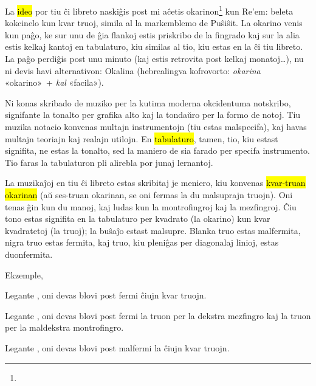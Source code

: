
La \hl{ideo} por tiu ĉi libreto naskiĝis post mi aĉetis okarinon\footnote{} kun Re’em: beleta kokcinelo kun kvar truoj, simila al la markemblemo de Puŝiŝit. La okarino venis kun paĝo, ke sur unu de ĝia flankoj estis priskribo de la fingrado kaj sur la alia estis kelkaj kantoj en tabulaturo, kiu similas al tio, kiu estas en la ĉi tiu libreto. La paĝo perdiĝis post unu minuto (kaj estis retrovita post kelkaj monatoj…), nu ni devis havi alternativon: Okalina (hebrealingva kofrovorto: \emph{okarina} «okarino»~+ \emph{kal} «facila»).



Ni konas skribado de muziko per la kutima moderna okcidentuma notskribo, signifante la tonalto per grafika alto kaj la tondaŭro per la formo de notoj. Tiu muzika notacio konvenas multajn instrumentojn (tiu estas malspecifa), kaj havas multajn teoriajn kaj realajn utilojn. En \hl{tabulaturo}, tamen, tio, kiu estast signifita, ne estas la tonalto, sed la maniero de sia farado per specifa instrumento. Tio faras la tabulaturon pli alirebla por junaj lernantoj.

La muzikaĵoj en tiu ĉi libreto estas skribitaj je meniero, kiu konvenas \hl{kvar-truan okarinan} (aŭ ses-truan okarinan, se oni fermas la du malsuprajn truojn). Oni tenas ĝin kun du manoj, kaj ludas kun la montrofingroj kaj la mezfingroj. Ĉiu tono estas signifita en la tabulaturo per kvadrato (la okarino) kun kvar kvadratetoj (la truoj); la buŝaĵo estast malsupre. Blanka truo estas malfermita, nigra truo estas fermita, kaj truo, kiu pleniĝas per diagonalaj linioj, estas duonfermita.

Ekzemple,
\begin{compactitem}
	\item Legante \enliniatabulaturo{\c}, oni devas blovi post fermi ĉiujn kvar truojn.
	\item Legante \enliniatabulaturo{\gis}, oni devas blovi post fermi la truon per la dekstra mezfingro kaj la truon per la maldekstra montrofingro.
	\item Legante \enliniatabulaturo{\C}, oni devas blovi post malfermi la ĉiujn kvar truojn.
\end{compactitem}

